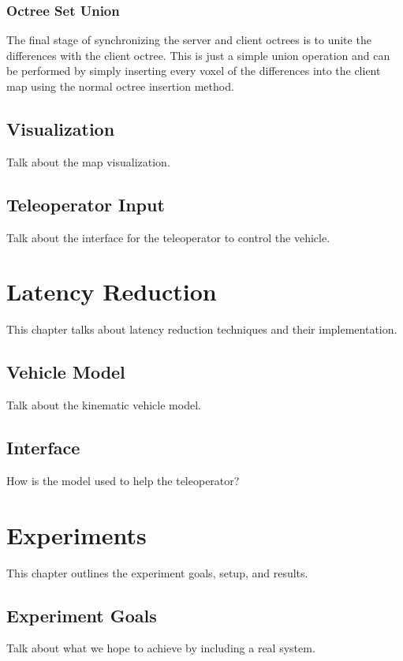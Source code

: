 \documentclass[12pt]{report}
\begin{document}
\subsection{Octree Set Union}
The final stage of synchronizing the server and client octrees is to unite the differences with the client octree. This is just a simple union operation and can be performed by simply inserting every voxel of the differences into the client map using the normal octree insertion method.\cite{meagher1982geometric}

\section{Visualization}
Talk about the map visualization.

\section{Teleoperator Input}
Talk about the interface for the teleoperator to control the vehicle.


\chapter{Latency Reduction}\label{chap:latency_reduction}
This chapter talks about latency reduction techniques and their implementation.

\section{Vehicle Model}
Talk about the kinematic vehicle model.

\section{Interface}
How is the model used to help the teleoperator?


\chapter{Experiments}\label{chap:experiments}
This chapter outlines the experiment goals, setup, and results.

\section{Experiment Goals}
Talk about what we hope to achieve by including a real system.
\end{document}
